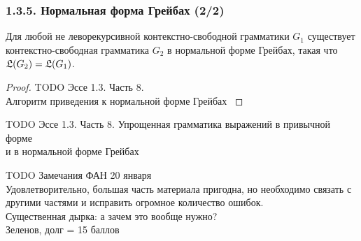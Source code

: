 \documentclass[mathserif,12pt,aspectratio=169]{beamer}
\def\TODO#1{{\color{gray} TODO {#1}}}
\begin{document}
\begin{frame}[shrink=22]
\frametitle{1.3.5. Нормальная форма Грейбах (2/2)}
\begin{theorem}
Для любой не леворекурсивной контекстно-свободной грамматики $G_1$
существует контекстно-свободная грамматика $G_2$ в нормальной форме Грейбах,
такая что  $\frak{L}(G_2)=\frak{L}(G_1)$.
\end{theorem}

\begin{proof}
\TODO{Эссе 1.3. Часть 8. \\ Алгоритм приведения к нормальной форме Грейбах 
}
\end{proof}

\begin{example}
\TODO{Эссе 1.3. Часть 8. Упрощенная грамматика выражений в привычной форме\\ и в нормальной форме Грейбах}
\end{example}

\bigskip
\TODO{{\color{red} Замечания ФАН 20 января}\\
Удовлетворительно, большая часть материала пригодна, но необходимо связать с другими частями и исправить огромное количество ошибок. \\
Существенная дырка: а зачем это вообще нужно?\\
Зеленов, долг = 15 баллов
 }

\end{frame}

\end{document}

